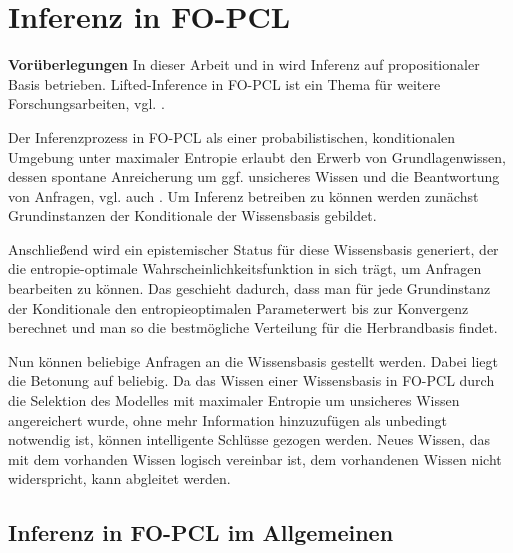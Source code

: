 \documentclass[draft]{scrreprt}
\begin{document}
\chapter{Inferenz in FO-PCL}\label{Inferenz}
\textbf{Vorüberlegungen}
In dieser Arbeit und in \cite{Fis12} wird Inferenz auf propositionaler Basis betrieben. Lifted-Inference in FO-PCL ist ein Thema für weitere Forschungsarbeiten, vgl. \cite[Kap.8, S. 194]{Fis12}.

Der Inferenzprozess in FO-PCL als einer probabilistischen, konditionalen Umgebung unter maximaler Entropie erlaubt den Erwerb von Grundlagenwissen, dessen spontane Anreicherung um ggf. unsicheres Wissen und die Beantwortung von Anfragen, vgl. auch \cite{RRK06}.
Um Inferenz betreiben zu können werden zunächst Grundinstanzen der Konditionale der Wissensbasis gebildet.

 Anschließend wird ein epistemischer Status für diese Wissensbasis generiert, der die entropie-optimale Wahrscheinlichkeitsfunktion in sich trägt, um Anfragen bearbeiten zu können. Das geschieht dadurch, dass man für jede Grundinstanz der Konditionale den entropieoptimalen Parameterwert bis zur Konvergenz berechnet und man so die bestmögliche Verteilung für die Herbrandbasis findet.

Nun können beliebige Anfragen an die Wissensbasis gestellt werden. Dabei liegt die Betonung auf beliebig. Da das Wissen einer Wissensbasis in FO-PCL durch die Selektion des Modelles mit maximaler Entropie um unsicheres Wissen angereichert wurde, ohne mehr Information hinzuzufügen als unbedingt notwendig ist, können intelligente Schlüsse gezogen werden. Neues Wissen, das mit dem vorhanden Wissen logisch vereinbar ist, dem vorhandenen Wissen nicht widerspricht, kann abgleitet werden. 

\section{Inferenz in FO-PCL im Allgemeinen}
\end{document}
